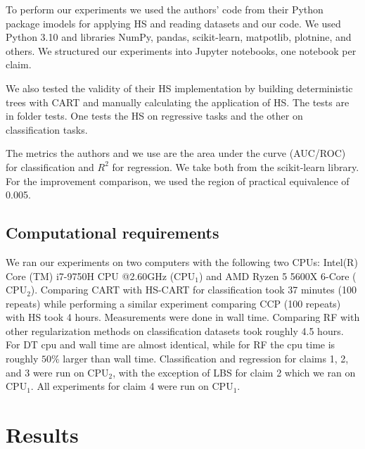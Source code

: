 To perform our experiments we used the authors' code from their Python package {\sf imodels} for applying HS and reading datasets and our code. We used Python 3.10 and libraries {\sf NumPy, pandas, scikit-learn, matpotlib, plotnine}, and others. We structured our experiments into Jupyter notebooks, one notebook per claim.


We also tested the validity of their HS implementation by building deterministic trees with CART and manually calculating the application of HS. The tests are in folder {\sf tests}. One tests the HS on regressive tasks and the other on classification tasks.

The metrics the authors and we use are the area under the curve (AUC/ROC) for classification and $ R^{2} $ for regression. We take both from the {\sf scikit-learn} library. For the improvement comparison, we used the region of practical equivalence of 0.005.


\subsection{Computational requirements}
We ran our experiments on two computers with the following two CPUs: Intel(R) Core (TM) i7-9750H CPU @2.60GHz ($\text{CPU}_1$) and AMD Ryzen 5 5600X 6-Core ($\text{CPU}_2$).
Comparing CART with HS-CART for classification took 37 minutes (100 repeats) while performing a similar experiment comparing CCP (100 repeats) with HS took 4 hours. Measurements were done in wall time.
Comparing RF with other regularization methods on classification datasets took roughly 4.5 hours.
For DT cpu and wall time are almost identical, while for RF the cpu time is roughly $50\%$ larger than wall time.
Classification and regression for claims 1, 2, and 3 were run on $\text{CPU}_2$, with the exception of LBS for claim 2 which we ran on $\text{CPU}_1$.
All experiments for claim 4 were run on $\text{CPU}_1$.


\section{Results}
\label{sec:results}

